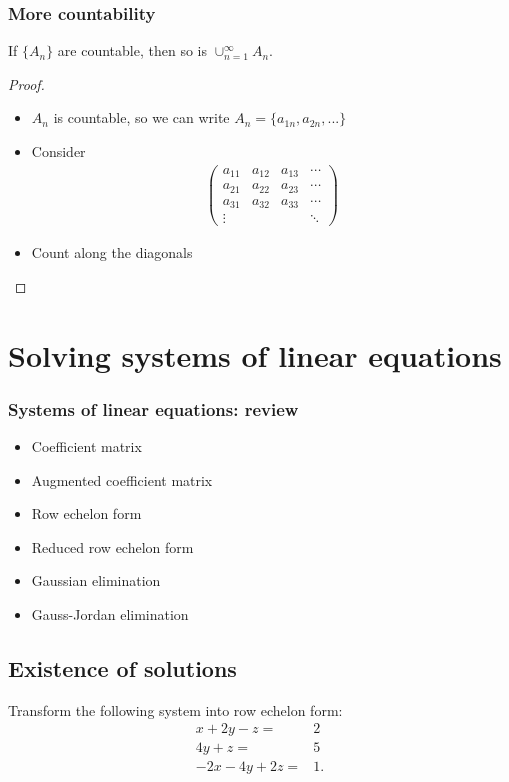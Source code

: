 \documentclass[compress]{beamer}
\begin{document}
\begin{frame}
  \frametitle{More countability}
  \begin{theorem}
    If $\{A_n\}$ are countable, then so is $\cup_{n=1}^\infty A_n$.
  \end{theorem}
  \begin{proof}
    \begin{itemize}
    \item $A_n$ is countable, so we can write $A_n = \{a_{1n}, a_{2n},
      ...\}$ 
    \item Consider 
      \begin{align*}
        \begin{pmatrix} 
          a_{11} & a_{12} & a_{13} & \cdots \\
          a_{21} & a_{22} & a_{23} & \cdots \\
          a_{31} & a_{32} & a_{33} & \cdots \\          
          \vdots &      &       & \ddots
        \end{pmatrix}
      \end{align*}
    \item Count along the diagonals
    \end{itemize}
  \end{proof}  
\end{frame}

\section{Solving systems of linear equations}

\begin{frame}
  \frametitle{Systems of linear equations: review}
  \begin{itemize}
  \item Coefficient matrix
  \item Augmented coefficient matrix
  \item Row echelon form
  \item Reduced row echelon form
  \item Gaussian elimination
  \item Gauss-Jordan elimination
  \end{itemize}
\end{frame}

\subsection{Existence of solutions}
\begin{frame}
  Transform the following system into row echelon form:
  \begin{align*}
    x + 2 y - z = & 2 \\
    4 y + z = & 5 \\
    -2x - 4y + 2z = & 1.
  \end{align*}
\end{frame}
\end{document}
